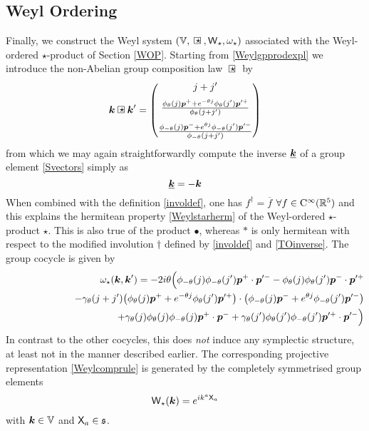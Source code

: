 \subsection{Weyl Ordering}
\label{WOPGWS}
Finally, we construct the Weyl system $(\mbbV,\compc,\weyl_\star,\omega_\star)$
associated with the Weyl-ordered $\star$-product of Section \ref{WOP}. Starting
from \eqref{Weylgpprodexpl} we introduce the non-Abelian group composition law
$\compc$ by
\begin{equation}
  \label{Weylcomplaw}
  \mk\compc\mk'=\begin{pmatrix}j+j' \\[2mm]
    \frac{\phi_\theta(j) \mbp^++
      e^{-\theta j} \phi_\theta(j' ) \mbp^{\prime +}}
    {\phi_\theta(j+j' )}\\[3mm]
    \frac{\phi_{-\theta}(j) \mbp^-+
      e^{\theta j} \phi_{-\theta}(j' ) \mbp^{\prime -}}
    {\phi_{-\theta}(j+j' )}\end{pmatrix}
\end{equation}
from which we may again straightforwardly compute the inverse $\underline{{{\boldsymbol {k} }}}$
of a group element \eqref{Svectors} simply as
\begin{equation}
  \label{Weylinverse}
  \underline{{{\boldsymbol {k} }}}=-{{\boldsymbol {k} }}
\end{equation}
When combined with the definition \eqref{involdef}, one has $f^\dag=\overline{f}$
$\forall f\in{\rm C}^\infty({\mathbb R}^5)$ and this explains the hermitean property
\eqref{Weylstarherm} of the Weyl-ordered $\star$-product $\star$. This is also
true of the product $\bullet$, whereas $*$ is only hermitean with respect to the
modified involution $\dag$ defined by \eqref{involdef} and \eqref{TOinverse}.
The group cocycle is given by
\begin{eqnarray}
  \label{Weylcocycle}
  &&\omega_\star({{\boldsymbol {k} }},{{\boldsymbol {k} }}' )=-2 i\theta \Bigl(
\phi_{-\theta}(j) \phi_{-\theta}(j' ) 
{{\boldsymbol {p} }}^+\cdot{{\boldsymbol {p} }}^{\prime -}-\phi_{\theta}(j) \phi_{\theta}(j' ) 
{{\boldsymbol {p} }}^-\cdot{{\boldsymbol {p} }}^{\prime +}\Bigr.\\\nonumber &&\qquad\qquad\qquad
- \gamma_\theta(j+j' ) \bigl(\phi_\theta(j) 
{{\boldsymbol {p} }}^++ e^{-\theta j} \phi_\theta(j' ) {{\boldsymbol {p} }}^{\prime +}\bigr)
\cdot\bigl(\phi_{-\theta}(j) 
{{\boldsymbol {p} }}^-+ e^{\theta j} \phi_{-\theta}(j' ) 
{{\boldsymbol {p} }}^{\prime -}\bigr)\\\nonumber &&
\qquad\qquad\qquad+\Bigl.
\gamma_\theta(j) \phi_\theta(j) \phi_{-\theta}(j) {{\boldsymbol {p} }}^+\cdot{{\boldsymbol {p} }}^-+
\gamma_\theta(j' ) \phi_\theta(j' ) \phi_{-\theta}(j' ) 
{{\boldsymbol {p} }}^{\prime +}\cdot{{\boldsymbol {p} }}^{\prime -}
\Bigr)
\end{eqnarray}
In contrast to the other cocycles, this does {\it not} induce any symplectic
structure, at least not in the manner described earlier. The corresponding
projective representation \eqref{Weylcomprule} is generated by the completely
symmetrised group elements
\begin{equation}
  \label{Weylweylop}
  \operatorname{{\sf W}}_\star({{\boldsymbol {k} }})= e^{ i k^a {\sf X}_a}
\end{equation}
with ${{\boldsymbol {k} }}\in{\mathbb V}$ and ${\sf X}_a\in{\mathfrak s}$.

